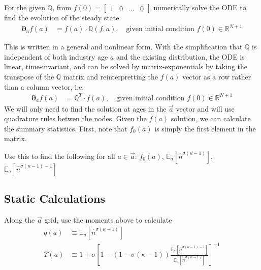 \documentclass[12pt]{article}
\newcommand{\set}[1]{\ensuremath{\left\{{#1}\right\}}}
\newcommand{\R}{\ensuremath{\mathbb{R}}}
\newcommand{\Q}[0]{\ensuremath{\mathbb{Q}}}
\newcommand{\D}[1][]{\ensuremath{\boldsymbol{\partial}_{#1}}}
\newcommand{\expec}[2][]{\ensuremath{\mathbb{E}_{{#1}}\left[ {#2} \right]}}
\begin{document}
For the given $\Q$, from $f(0) = \begin{bmatrix}1 & 0 & \ldots & 0\end{bmatrix}$ numerically solve the ODE to find the evolution of the steady state.
\begin{align}
	\D[a]f(a) &= f(a) \cdot \Q(f, a),\quad \text{given initial condition } f(0)\in\R^{N+1}\label{eq:f-evolution-ode}
\end{align}

This is written in a general and nonlinear form.  With the simplification that $\Q$ is independent of both industry age $a$ and the existing distribution, the ODE is linear, time-invariant, and can be solved by matrix-exponentials by taking the transpose of the $\Q$ matrix and reinterpretting the $f(a)$ vector as a row rather than a column vector,  i.e.
\begin{align}
	\D[a]f(a) &= \Q^T \cdot f(a),\quad \text{given initial condition } f(0)\in\R^{N+1}\label{eq:f-evolution-ode}
\end{align}
We will only need to find the solution at ages in the $\vec{a}$ vector and will use quadrature rules betwen the nodes.   Given the $f(a)$ solution, we can calculate the summary statistics.  First, note that $f_0(a)$ is simply the first element in the matrix.  %

Use this to find the following for all $a \in \vec{a}$: $f_0(a)$, $\expec[a]{\hat{n}^{\sigma(\kappa - 1)}}$, $\expec[a]{\hat{n}^{\sigma(\kappa - 1)-1}}$

\subsection{Static Calculations}
Along the $\vec{a}$ grid, use the moments above to calculate
\begin{align}
	q(a) &\equiv \expec[a]{\hat{n}^{\sigma(\kappa - 1)}}\label{eq:a-Q-def}\\
	\Upsilon(a)	&\equiv 1 + \sigma\left[{1 - (1-\sigma(\kappa-1))\frac{\expec[a]{\hat{n}^{\sigma ( \kappa - 1) -1}}}{\expec[a]{\hat{n}^{\sigma ( \kappa - 1)}}}} \right]^{-1}\label{eq:markup-def}
\end{align}
\end{document}
